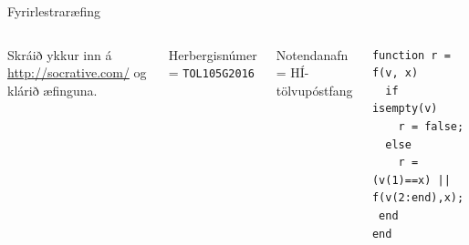\documentclass{beamer}
\begin{document}
\begin{frame}[fragile]{Fyrirlestraræfing}
\begin{columns}

Skráið ykkur inn á \url{http://socrative.com/} og klárið æfinguna.

Herbergisnúmer = \texttt{TOL105G2016}

Notendanafn = HÍ-tölvupóstfang

\begin{verbatim}
function r = f(v, x)
  if isempty(v)
    r = false;
  else
    r = (v(1)==x) || f(v(2:end),x);
 end
end
\end{verbatim}

\end{columns}
\end{frame}
\end{document}
